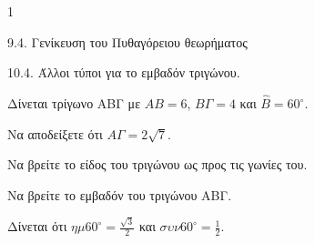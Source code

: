 \begin{ylh}{1}
    \item 9.4. Γενίκευση του Πυθαγόρειου θεωρήματος
    \item 10.4. Άλλοι τύποι για το εμβαδόν τριγώνου.
\end{ylh}
Δίνεται τρίγωνο ΑΒΓ με $AB = 6$, $B\Gamma = 4$ και $\hat{B} = 60^{\circ}$.
\begin{alist}
\item Να αποδείξετε ότι $A\Gamma = 2\sqrt{7}$. 
\item Να βρείτε το είδος του τριγώνου ως προς τις γωνίες του. 
\item Να βρείτε το εμβαδόν του τριγώνου ΑΒΓ. 
\end{alist}
Δίνεται ότι $\eta\mu 60^{\circ} = \frac{\sqrt{3}}{2}$ και $\sigma\upsilon\nu 60^{\circ} = \frac{1}{2}$.